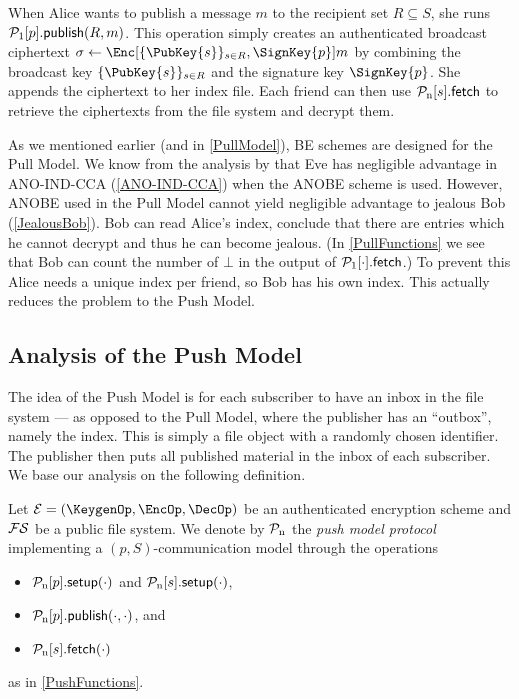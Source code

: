 When Alice wants to publish a message \(m\) to the recipient set \(R\subseteq 
  S\), she runs \(\ppub{p}[R][m]\).
This operation simply creates an authenticated broadcast ciphertext 
\(\sigma\gets \Enc[\{\PubKey{s}\}_{s\in R}, \SignKey{p}]{m}\) by combining the 
broadcast key \(\{\PubKey{s}\}_{s\in R}\) and the signature key 
\(\SignKey{p}\).
She appends the ciphertext to her index file.
Each friend can then use \(\pnget{s}\) to retrieve the ciphertexts from the 
file system and decrypt them.

As we mentioned earlier (and in \cref{PullModel}), \ac{BE} schemes are designed 
for the Pull Model.
We know from the analysis by \citet{ANOBE} that Eve has negligible advantage in 
ANO-IND-CCA (\cref{ANO-IND-CCA}) when the \ac{ANOBE} scheme is used.
However, \ac{ANOBE} used in the Pull Model cannot yield negligible advantage to
jealous Bob (\cref{JealousBob}).
Bob can read Alice's index, conclude that there are entries which he cannot 
decrypt and thus he can become jealous.
(In \cref{PullFunctions} we see that Bob can count the number of \(\bot\) in 
the output of \(\pget{\cdot}\).)
To prevent this Alice needs a unique index per friend, so Bob has his own 
index.
This actually reduces the problem to the Push Model.

\subsection{Analysis of the Push Model}
\label{PushAnalysis}

The idea of the Push Model is for each subscriber to have an inbox in the file 
system --- as opposed to the Pull Model, where the publisher has an 
\enquote{outbox}, namely the index.
This is simply a file object with a randomly chosen identifier.
The publisher then puts all published material in the inbox of each subscriber.
We base our analysis on the following definition.

\begin{definition}\label{PushModel}
  Let \(\mathcal{E} = (\KeygenOp, \EncOp, \DecOp)\) be an authenticated 
  encryption scheme and \(\operatorname{\mathcal{FS}}\) be a public file system.
  We denote by \(\operatorname{\mathcal{P}_n}\) the \emph{push model protocol} implementing a \((p, 
    S)\)-communication model through the operations
  \begin{itemize}
    \item \(\pnsetup{p}[\cdot]\) and \(\pnsetup{s}[\cdot]\),
    \item \(\pnpub{p}[\cdot][\cdot]\), and
    \item \(\pnget{s}[\cdot]\)
  \end{itemize}
  as in \cref{PushFunctions}.
\end{definition}

